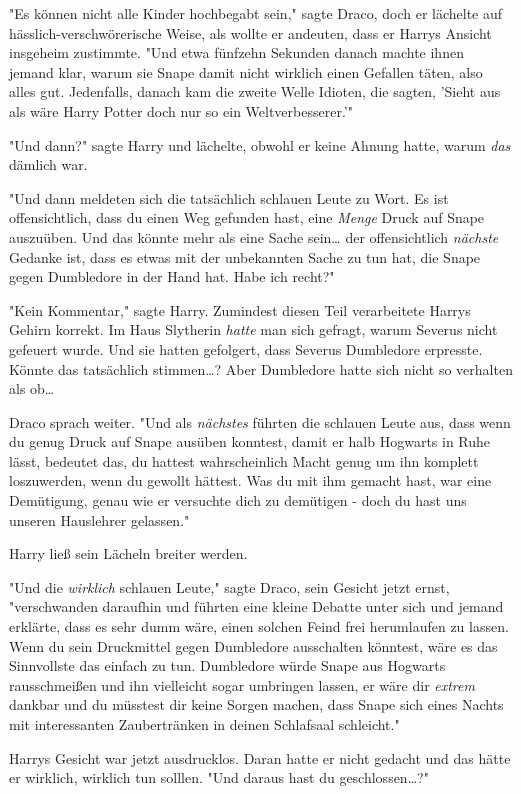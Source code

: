 {"Es können nicht alle Kinder hochbegabt sein," sagte Draco, doch er lächelte auf hässlich-verschwörerische Weise, als wollte er andeuten, dass er Harrys Ansicht insgeheim zustimmte. "Und etwa fünfzehn Sekunden danach machte ihnen jemand klar, warum sie Snape damit nicht wirklich einen Gefallen täten, also alles gut. Jedenfalls, danach kam die zweite Welle Idioten, die sagten, 'Sieht aus als wäre Harry Potter doch nur so ein Weltverbesserer.'"

"Und dann?" sagte Harry und lächelte, obwohl er keine Ahnung hatte, warum \emph{das} dämlich war.

"Und dann meldeten sich die tatsächlich schlauen Leute zu Wort. Es ist offensichtlich, dass du einen Weg gefunden hast, eine \emph{Menge} Druck auf Snape auszuüben. Und das könnte mehr als eine Sache sein… der offensichtlich \emph{nächste} Gedanke ist, dass es etwas mit der unbekannten Sache zu tun hat, die Snape gegen Dumbledore in der Hand hat. Habe ich recht?"

"Kein Kommentar," sagte Harry. Zumindest diesen Teil verarbeitete Harrys Gehirn korrekt. Im Haus Slytherin \emph{hatte} man sich gefragt, warum Severus nicht gefeuert wurde. Und sie hatten gefolgert, dass Severus Dumbledore erpresste. Könnte das tatsächlich stimmen…? Aber Dumbledore hatte sich nicht so verhalten als ob…

Draco sprach weiter. "Und als \emph{nächstes} führten die schlauen Leute aus, dass wenn du genug Druck auf Snape ausüben konntest, damit er halb Hogwarts in Ruhe lässt, bedeutet das, du hattest wahrscheinlich Macht genug um ihn komplett loszuwerden, wenn du gewollt hättest. Was du mit ihm gemacht hast, war eine Demütigung, genau wie er versuchte dich zu demütigen - doch du hast uns unseren Hauslehrer gelassen."

Harry ließ sein Lächeln breiter werden.

"Und die \emph{wirklich} schlauen Leute," sagte Draco, sein Gesicht jetzt ernst, "verschwanden daraufhin und führten eine kleine Debatte unter sich und jemand erklärte, dass es sehr dumm wäre, einen solchen Feind frei herumlaufen zu lassen. Wenn du sein Druckmittel gegen Dumbledore ausschalten könntest, wäre es das Sinnvollste das einfach zu tun. Dumbledore würde Snape aus Hogwarts rausschmeißen und ihn vielleicht sogar umbringen lassen, er wäre dir \emph{extrem} dankbar und du müsstest dir keine Sorgen machen, dass Snape sich eines Nachts mit interessanten Zaubertränken in deinen Schlafsaal schleicht."

Harrys Gesicht war jetzt ausdrucklos. Daran hatte er nicht gedacht und das hätte er wirklich, wirklich tun solllen. "Und daraus hast du geschlossen…?"

}
